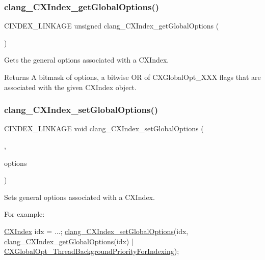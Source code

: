 \subsubsection{\texorpdfstring{clang\+\_\+\+C\+X\+Index\+\_\+get\+Global\+Options()}{clang\_CXIndex\_getGlobalOptions()}}
{\footnotesize\ttfamily C\+I\+N\+D\+E\+X\+\_\+\+L\+I\+N\+K\+A\+GE unsigned clang\+\_\+\+C\+X\+Index\+\_\+get\+Global\+Options (\begin{DoxyParamCaption}\item[{\hyperlink{group__CINDEX_gae039c2574bfd75774ca7a9a3e55910cb}{C\+X\+Index}}]{ }\end{DoxyParamCaption})}



Gets the general options associated with a C\+X\+Index. 

\begin{DoxyReturn}{Returns}
A bitmask of options, a bitwise OR of C\+X\+Global\+Opt\+\_\+\+X\+XX flags that are associated with the given C\+X\+Index object. 
\end{DoxyReturn}
\mbox{\label{group__CINDEX_ga82c320cc4c21dfd64650b3995cb5e7a6}} 
\subsubsection{\texorpdfstring{clang\+\_\+\+C\+X\+Index\+\_\+set\+Global\+Options()}{clang\_CXIndex\_setGlobalOptions()}}
{\footnotesize\ttfamily C\+I\+N\+D\+E\+X\+\_\+\+L\+I\+N\+K\+A\+GE void clang\+\_\+\+C\+X\+Index\+\_\+set\+Global\+Options (\begin{DoxyParamCaption}\item[{\hyperlink{group__CINDEX_gae039c2574bfd75774ca7a9a3e55910cb}{C\+X\+Index}}]{,  }\item[{unsigned}]{options }\end{DoxyParamCaption})}



Sets general options associated with a C\+X\+Index. 

For example\+: 
\begin{DoxyCode}
\hyperlink{group__CINDEX_gae039c2574bfd75774ca7a9a3e55910cb}{CXIndex} idx = ...;
\hyperlink{group__CINDEX_ga82c320cc4c21dfd64650b3995cb5e7a6}{clang\_CXIndex\_setGlobalOptions}(idx,
    \hyperlink{group__CINDEX_ga21e96379358f2aedc56890f9a35d4125}{clang\_CXIndex\_getGlobalOptions}(idx) |
    \hyperlink{group__CINDEX_gga1b451634928d6bcc961bf72a40e4d035aba7b16ae973f035cd4156eeae579e47a}{CXGlobalOpt\_ThreadBackgroundPriorityForIndexing});
\end{DoxyCode}



